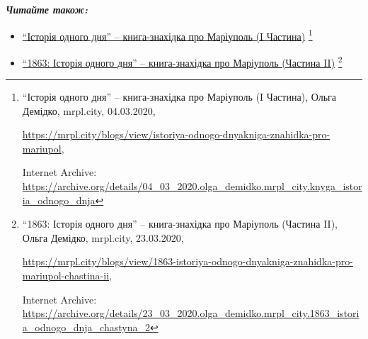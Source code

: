 \textbf{\emph{Читайте також:}} 

\begin{itemize} %

\item \href{https://archive.org/details/04_03_2020.olga_demidko.mrpl_city.knyga_istoria_odnogo_dnja}{%
\enquote{Історія одного дня} – книга-знахідка про Маріуполь (I Частина)}%
\footnote{\enquote{Історія одного дня} – книга-знахідка про Маріуполь (I Частина), Ольга Демідко, mrpl.city, 04.03.2020, \par%
\url{https://mrpl.city/blogs/view/istoriya-odnogo-dnyakniga-znahidka-pro-mariupol}, \par%
Internet Archive: \url{https://archive.org/details/04_03_2020.olga_demidko.mrpl_city.knyga_istoria_odnogo_dnja}
}

\item \href{https://archive.org/details/23_03_2020.olga_demidko.mrpl_city.1863_istoria_odnogo_dnja_chastyna_2}{\enquote{1863: Історія одного дня} – книга-знахідка про Маріуполь (Частина II)}%
\footnote{\enquote{1863: Історія одного дня} – книга-знахідка про Маріуполь (Частина II), Ольга Демідко, mrpl.city, 23.03.2020, \par%
\url{https://mrpl.city/blogs/view/1863-istoriya-odnogo-dnyakniga-znahidka-pro-mariupol-chastina-ii}, \par%
Internet Archive: \url{https://archive.org/details/23_03_2020.olga_demidko.mrpl_city.1863_istoria_odnogo_dnja_chastyna_2}
}

\end{itemize} %

